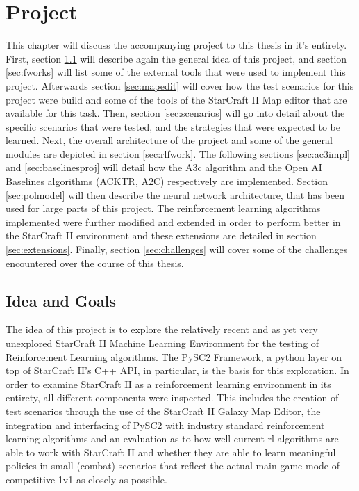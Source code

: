
\chapter{Project} %

\label{chap_prac} %


This chapter will discuss the accompanying project to this thesis in it's entirety. First, section \ref{sec:idea} will describe again the general idea of this project, and section \ref{sec:fworks} will list some of the external tools that were used to implement this project. Afterwards section \ref{sec:mapedit} will cover how the test scenarios for this project were build and some of the tools of the StarCraft II Map editor that are available for this task.
Then, section \ref{sec:scenarios} will go into detail about the specific scenarios that were tested, and the strategies that were expected to be learned. Next, the overall architecture of the project and some of the general modules are depicted in section \ref{sec:rlfwork}. The following sections \ref{sec:ac3impl} and \ref{sec:baselinesproj} will detail how the A3c algorithm and the Open AI Baselines algorithms (ACKTR, A2C) respectively are implemented. Section \ref{sec:polmodel} will then describe the neural network architecture, that has been used for large parts of this project. The reinforcement learning algorithms implemented were further modified and extended in order to perform better in the StarCraft II environment and these extensions are detailed in section \ref{sec:extensions}. Finally, section \ref{sec:challenges} will cover some of the challenges encountered over the course of this thesis.


\section{Idea and Goals}
\label{sec:idea}
The idea of this project is to explore the relatively recent and as yet very unexplored StarCraft II Machine Learning Environment for the testing of Reinforcement Learning algorithms. The PySC2 Framework, a python layer on top of StarCraft II's C++ API, in particular, is the basis for this exploration. In order to examine StarCraft II as a reinforcement learning environment in its entirety, all different components were inspected. This includes the creation of test scenarios through the use of the StarCraft II Galaxy Map Editor, the integration and interfacing of PySC2 with industry standard reinforcement learning algorithms and an evaluation as to how well current rl algorithms are able to work with StarCraft II and whether they are able to learn meaningful policies in small (combat) scenarios that reflect the actual main game mode of competitive 1v1 as closely as possible.

